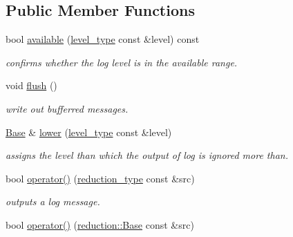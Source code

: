 \subsection*{Public Member Functions}
\begin{DoxyCompactItemize}
\item 
\hypertarget{classhryky_1_1log_1_1writer_1_1_base_a8ce37ac3efe4c77e4020bdbaebda85b3}{bool \hyperlink{classhryky_1_1log_1_1writer_1_1_base_a8ce37ac3efe4c77e4020bdbaebda85b3}{available} (\hyperlink{classhryky_1_1log_1_1level_1_1_entity}{level\-\_\-type} const \&level) const }\label{classhryky_1_1log_1_1writer_1_1_base_a8ce37ac3efe4c77e4020bdbaebda85b3}

\begin{DoxyCompactList}\small\item\em confirms whether the log level is in the available range. \end{DoxyCompactList}\item 
\hypertarget{classhryky_1_1log_1_1writer_1_1_base_a96f6db3720375594d5e439e37934e1ee}{void \hyperlink{classhryky_1_1log_1_1writer_1_1_base_a96f6db3720375594d5e439e37934e1ee}{flush} ()}\label{classhryky_1_1log_1_1writer_1_1_base_a96f6db3720375594d5e439e37934e1ee}

\begin{DoxyCompactList}\small\item\em write out bufferred messages. \end{DoxyCompactList}\item 
\hypertarget{classhryky_1_1log_1_1writer_1_1_base_a735851176de76433ee681fd20e70a236}{\hyperlink{classhryky_1_1log_1_1writer_1_1_base}{Base} \& \hyperlink{classhryky_1_1log_1_1writer_1_1_base_a735851176de76433ee681fd20e70a236}{lower} (\hyperlink{classhryky_1_1log_1_1level_1_1_entity}{level\-\_\-type} const \&level)}\label{classhryky_1_1log_1_1writer_1_1_base_a735851176de76433ee681fd20e70a236}

\begin{DoxyCompactList}\small\item\em assigns the level than which the output of log is ignored more than. \end{DoxyCompactList}\item 
bool \hyperlink{classhryky_1_1log_1_1writer_1_1_base_a58d85035f2869f184b039b1c3760bb15}{operator()} (\hyperlink{namespacehryky_a343a9a4c36a586be5c2693156200eadc}{reduction\-\_\-type} const \&src)
\begin{DoxyCompactList}\small\item\em outputs a log message. \end{DoxyCompactList}\item 
\hypertarget{classhryky_1_1log_1_1writer_1_1_base_a5d2f205ab84e7dcf4ab4cca10389949b}{bool \hyperlink{classhryky_1_1log_1_1writer_1_1_base_a5d2f205ab84e7dcf4ab4cca10389949b}{operator()} (\hyperlink{classhryky_1_1reduction_1_1_base}{reduction\-::\-Base} const \&src)}\label{classhryky_1_1log_1_1writer_1_1_base_a5d2f205ab84e7dcf4ab4cca10389949b}


\end{DoxyCompactItemize}
